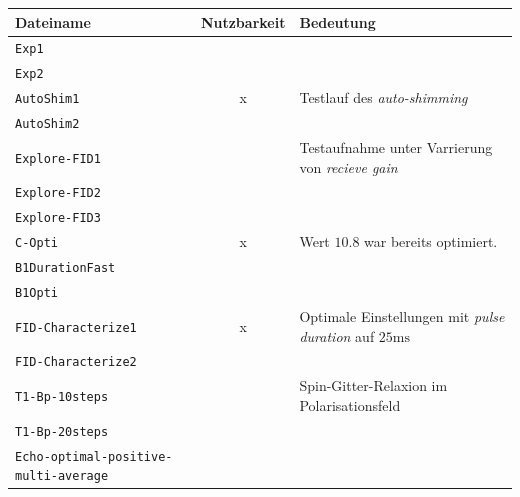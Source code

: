 \documentclass{subfiles}
\begin{document}
        \begin{table}[H]
            \centering
            \begin{tabular}{p{4cm}|c|p{6cm}}
                \textbf{Dateiname} & \textbf{Nutzbarkeit} & \textbf{Bedeutung} \\
                \hline\hline
                \texttt{Exp1} & & \\
                \texttt{Exp2} & & \\
                \hline
                \texttt{AutoShim1} & x & Testlauf des \emph{auto-shimming} \\
                \texttt{AutoShim2} & & \\
                \hline
                \texttt{Explore-FID1} & & Testaufnahme unter Varrierung von \emph{recieve gain} \\
                \texttt{Explore-FID2} & & \\
                \texttt{Explore-FID3} & & \\
                \hline
                \texttt{C-Opti} & x & Wert $10.8$ war bereits optimiert. \\
                \hline
                \texttt{B1DurationFast} & & \\
                \texttt{B1Opti} & & \\
                \hline
                \texttt{FID-Characterize1} & x & Optimale Einstellungen mit \emph{pulse duration} auf $25\si{\ms}$\\
                \texttt{FID-Characterize2} & & \\
                \hline
                \texttt{T1-Bp-10steps} & & Spin-Gitter-Relaxion im Polarisationsfeld \\
                \texttt{T1-Bp-20steps} & & \\
                \hline
                \texttt{Echo-optimal-}\texttt{positive-multi-average} & & \\
            \end{tabular}
        \end{table}
\end{document}
